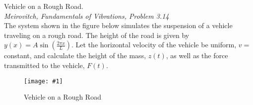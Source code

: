 \documentclass[11pt]{article}
\newcommand{\fig}[4]{
    \begin{figure}[H]
        \centering
        \texttt{[image: \#1]}
        \caption{#2}
        \label{exp4fit}
    \end{figure}
}
\theoremstyle{gangnamstyle}{\newtheorem{definition}{Definition}[]}
\theoremstyle{gangnamstyle}{\newtheorem{example}{Example}[]}
\theoremstyle{gangnamstyle}{\newtheorem{problem}{Problem}[]}
\theoremstyle{gangnamstyle}{\newtheorem{warning}{Warning}[]}
\begin{document}
\pagebreak

\begin{problem}
Vehicle on a Rough Road. \\
\textit{Meirovitch, Fundamentals of Vibrations, Problem 3.14} \\
The system shown in the figure below simulates the suspension of a vehicle traveling on a rough road. The height of the road is given by $y(x) = A\sin(\frac{2\pi x}{L})$. Let the horizontal velocity of the vehicle be uniform, $v =$ constant, and calculate the height of the mass, $z(t)$, as well as the force transmitted to the vehicle, $F(t)$.

\fig{figs/n2/road.png}{Vehicle on a Rough Road}{0.4}{0}
\end{problem}
\end{document}

